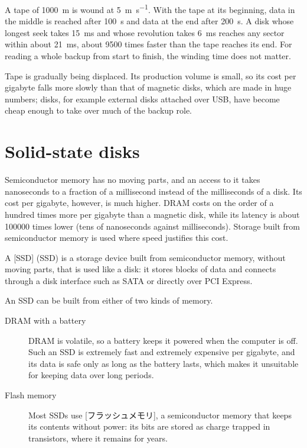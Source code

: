 \documentclass[../main.tex]{subfiles}
\begin{document}
\begin{example}
  \label{ex:l16-tape}
  A tape of \SI{1000}{\metre} is wound at
  \SI[per-mode=symbol]{5}{\metre\per\second}.  With the tape at its
  beginning, data in the middle is reached after
  \SI{100}{\second} and data at the end after \SI{200}{\second}.  A disk
  whose longest seek takes \SI{15}{\milli\second} and whose revolution takes
  \SI{6}{\milli\second} reaches any sector within about
  \SI{21}{\milli\second}, about \num{9500} times faster than the tape
  reaches its end.  For reading a whole backup from start to finish, the
  winding time does not matter.
\end{example}

Tape is gradually being displaced.  Its production volume is small, so its
cost per gigabyte falls more slowly than that of magnetic disks, which are
made in huge numbers; disks, for example external disks attached over USB,
have become cheap enough to take over much of the backup role.

\section{Solid-state disks}
\label{sec:l16-ssd}

Semiconductor memory has no moving parts, and an access to it takes
nanoseconds to a fraction of a millisecond instead of the milliseconds of a
disk.  Its cost per gigabyte,
however, is much higher.  DRAM costs on the order of a hundred times more per
gigabyte than a magnetic disk, while its latency is about \num{100000} times
lower (tens of nanoseconds against milliseconds).  Storage built from
semiconductor memory is used where speed justifies this cost.

\begin{definition}
  A [SSD] (SSD) is a
  storage device built from semiconductor memory, without moving parts, that
  is used like a disk: it stores blocks of data and connects through a disk
  interface such as SATA or directly over PCI Express.
\end{definition}

An SSD can be built from either of two kinds of memory.
\begin{description}
  \item[DRAM with a battery] DRAM is volatile, so a battery keeps it powered
    when the computer is off.  Such an SSD is extremely fast and extremely
    expensive per gigabyte, and its data is safe only as long as the battery
    lasts, which makes it unsuitable for keeping data over long periods.
  \item[Flash memory] Most SSDs use [フラッシュメモリ],
    a semiconductor memory that keeps its contents without power: its bits
    are stored as charge trapped in transistors, where it remains for years.
\end{description}
\end{document}

